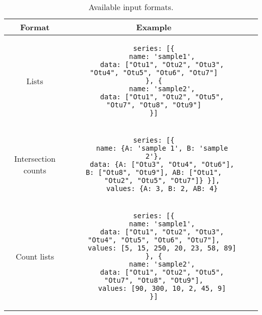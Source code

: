 \documentclass{bmcart}
\begin{document}
\begin{backmatter}
\begin{table}[h!]
\caption{Available input formats.}\label{table::format}
      \begin{tabular}{cccc}
        \hline
        Format & Example\\ \hline
        Lists & 
\begin{lstlisting}
series: [{
	name: 'sample1',
	data: ["Otu1", "Otu2", "Otu3", "Otu4", "Otu5", "Otu6", "Otu7"]
}, {
	name: 'sample2',
	data: ["Otu1", "Otu2", "Otu5", "Otu7", "Otu8", "Otu9"]
}]
\end{lstlisting}\\ \hline
        Intersection counts & 
\begin{lstlisting}
series: [{
	name: {A: 'sample 1', B: 'sample 2'},
	data: {A: ["Otu3", "Otu4", "Otu6"], B: ["Otu8", "Otu9"], AB: ["Otu1",
	"Otu2", "Otu5", "Otu7"]} }],
	values: {A: 3, B: 2, AB: 4}
\end{lstlisting}\\ \hline
        Count lists  &
\begin{lstlisting}
series: [{
	name: 'sample1',
	data: ["Otu1", "Otu2", "Otu3", "Otu4", "Otu5", "Otu6", "Otu7"],
	values: [5, 15, 250, 20, 23, 58, 89]
}, {
	name: 'sample2',
	data: ["Otu1", "Otu2", "Otu5", "Otu7", "Otu8", "Otu9"],
	values: [90, 300, 10, 2, 45, 9]
}]
\end{lstlisting}\\ \hline
      \end{tabular}
\end{table}

\end{backmatter}
\end{document}
